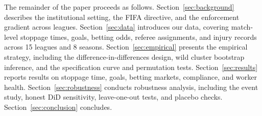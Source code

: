 The remainder of the paper proceeds as follows. Section~\ref{sec:background} describes the institutional setting, the FIFA directive, and the enforcement gradient across leagues. Section~\ref{sec:data} introduces our data, covering match-level stoppage times, goals, betting odds, referee assignments, and injury records across 15 leagues and 8 seasons. Section~\ref{sec:empirical} presents the empirical strategy, including the difference-in-differences design, wild cluster bootstrap inference, and the specification curve and permutation tests. Section~\ref{sec:results} reports results on stoppage time, goals, betting markets, compliance, and worker health. Section~\ref{sec:robustness} conducts robustness analysis, including the event study, honest DiD sensitivity, leave-one-out tests, and placebo checks. Section~\ref{sec:conclusion} concludes.
